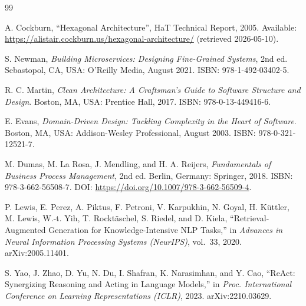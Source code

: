 \adjustmtc
\renewcommand\bibname{BIBLIOGRAPHY}
\begin{thebibliography}{99}
\thispagestyle{MyStyle}



A. Cockburn, ``Hexagonal Architecture'', HaT Technical Report, 2005.
Available: \url{https://alistair.cockburn.us/hexagonal-architecture/}
(retrieved 2026-05-10).

S. Newman, \emph{Building Microservices: Designing Fine-Grained Systems},
2nd ed. Sebastopol, CA, USA: O'Reilly Media, August 2021.
ISBN: 978-1-492-03402-5.

R. C. Martin, \emph{Clean Architecture: A Craftsman's Guide to Software Structure
and Design}. Boston, MA, USA: Prentice Hall, 2017. ISBN: 978-0-13-449416-6.

E. Evans, \emph{Domain-Driven Design: Tackling Complexity in the Heart of
Software}. Boston, MA, USA: Addison-Wesley Professional, August 2003.
ISBN: 978-0-321-12521-7.

M. Dumas, M. La Rosa, J. Mendling, and H. A. Reijers, \emph{Fundamentals of
Business Process Management}, 2nd ed. Berlin, Germany: Springer, 2018.
ISBN: 978-3-662-56508-7. DOI: \url{https://doi.org/10.1007/978-3-662-56509-4}.


P. Lewis, E. Perez, A. Piktus, F. Petroni, V. Karpukhin, N. Goyal, H. K\"uttler,
M. Lewis, W.-t. Yih, T. Rockt\"aschel, S. Riedel, and D. Kiela,
``Retrieval-Augmented Generation for Knowledge-Intensive NLP Tasks,''
in \emph{Advances in Neural Information Processing Systems (NeurIPS)}, vol.~33,
2020. arXiv:2005.11401.

S. Yao, J. Zhao, D. Yu, N. Du, I. Shafran, K. Narasimhan, and Y. Cao,
``ReAct: Synergizing Reasoning and Acting in Language Models,''
in \emph{Proc. International Conference on Learning Representations (ICLR)},
2023. arXiv:2210.03629.


\end{thebibliography}
